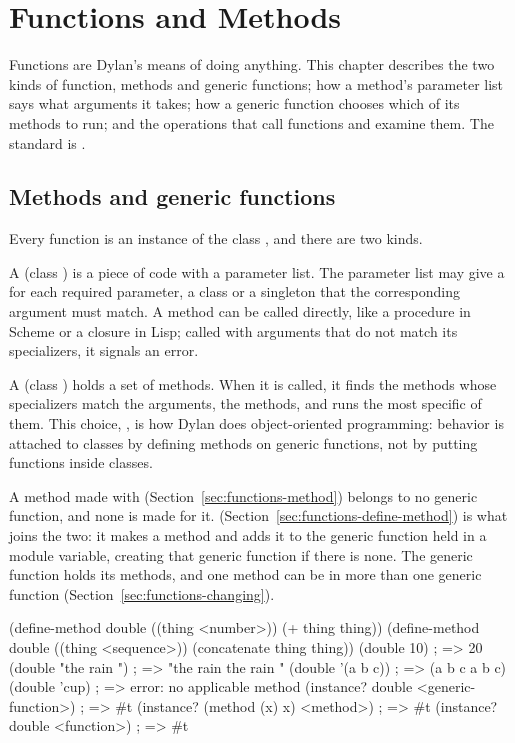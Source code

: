 \chapter{Functions and Methods}\label{ch:functions}

Functions are Dylan's means of doing anything. This chapter describes the
two kinds of function, methods and generic functions; how a method's
parameter list says what arguments it takes; how a generic function
chooses which of its methods to run; and the operations that call
functions and examine them. The standard is .

\section{Methods and generic functions}\label{sec:functions-overview}

Every function is an instance of the class
, and there are two
kinds.

A  (class ) is a piece of code with a parameter
list. The parameter list may give a  for each required
parameter, a class or a singleton that the corresponding argument must
match. A method can be called directly, like a procedure in Scheme or a
closure in Lisp; called with arguments that do not match its specializers,
it signals an error.

A  (class ) holds a set of
methods. When it is called, it finds the methods whose specializers match
the arguments, the  methods, and runs the most specific of
them. This choice, , is how Dylan does
object-oriented programming: behavior is attached to classes by defining
methods on generic functions, not by putting functions inside classes.

A method made with  (Section~\ref{sec:functions-method})
belongs to no generic function, and none is made for it.
 (Section~\ref{sec:functions-define-method}) is what
joins the two: it makes a method and adds it to the generic function held
in a module variable, creating that generic function if there is none. The
generic function holds its methods, and one method can be in more than one
generic function (Section~\ref{sec:functions-changing}).

\begin{dylan}
(define-method double ((thing <number>))
  (+ thing thing))
(define-method double ((thing <sequence>))
  (concatenate thing thing))
(double 10)                   ; => 20
(double "the rain ")          ; => "the rain the rain "
(double '(a b c))             ; => (a b c a b c)
(double 'cup)                 ; => error: no applicable method
(instance? double <generic-function>)          ; => #t
(instance? (method (x) x) <method>)            ; => #t
(instance? double <function>)                  ; => #t
\end{dylan}

